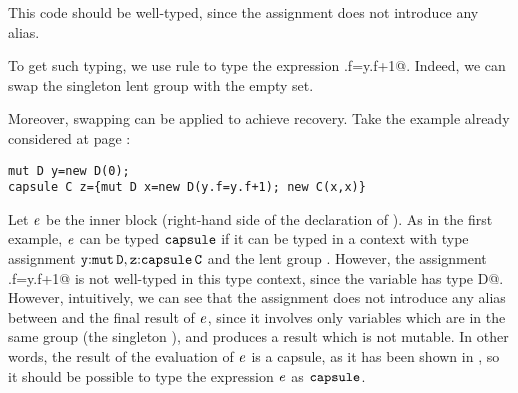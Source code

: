 This code should be well-typed, since the assignment does not introduce any alias. {To get such typing, we use rule  to type the expression
\Q@y.f=y.f+1@. {Indeed, we can} swap the singleton {lent group} \Q@y@ with the empty set.

Moreover, swapping can be applied to achieve {recovery}. Take
the example already considered at page \pageref{capsule-example-1}:
\begin{lstlisting}
mut D y=new D(0); 
capsule C z={mut D x=new D(y.f=y.f+1); new C(x,x)}
\end{lstlisting}
Let $\mathit{e}$ be the inner block (right-hand side of the declaration of \Q@z@). As in the first example, $\mathit{e}$ can be typed $\texttt{capsule}$ if it can be typed \Q@mut@ in a context with type assignment $\texttt{y}{:}\texttt{mut}\,\texttt{D},\texttt{z}{:}\texttt{capsule}\,\texttt{C}$ and
the {lent group} \Q@y@. However, the assignment \Q@y.f=y.f+1@
is not well-typed in this type context, since the variable \Q@y@ has type \Q@lent D@. However, intuitively, we can see that the assignment does not introduce any alias between \Q@y@ and the final result of $\mathit{e}$, since it involves only variables which are in the same group (the
singleton \Q@y@), and produces {a result which is not mutable}. {In other words, the result of the evaluation of $\mathit{e}$ is a capsule, as it has been shown in , so it should be possible to
{type} the expression $\mathit{e}$ {as} $\texttt{capsule}$.} 

}
